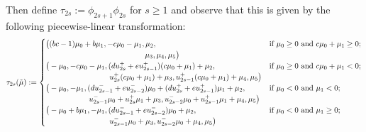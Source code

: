 \documentclass{amsart}
\numberwithin{theorem}{section}
\begin{document}
  Then define $\tau_{2s}:=\phi_{2s+1}\phi_{2s}$ for $s\ge 1$ and observe that this is given by the following piecewise-linear transformation:
  \begin{equation}
    \tau_{2s}(\tilde\mu)
    :=
    \begin{cases} 
      \big((bc-1)\mu_0+b\mu_1,-c\mu_0-\mu_1,\mu_2, & \text{if $\mu_0 \ge 0$ and $c\mu_0+\mu_1 \ge 0$;}\\
      \hspace{1.79in} \mu_3,\mu_4,\mu_5\big) & \\
      \big(-\mu_0,-c\mu_0-\mu_1,(du_{2s}^++eu_{2s-1}^+)(c\mu_0+\mu_1)+\mu_2, & \text{if $\mu_0 \ge 0$ and $c\mu_0+\mu_1 < 0$;}\\
      \hspace{1.15in} u_{2s}^+(c\mu_0+\mu_1)+\mu_3,u_{2s-1}^+(c\mu_0+\mu_1)+\mu_4,\mu_5\big) & \\ 
      \big(-\mu_0,-\mu_1,(du_{2s-1}^-+eu_{2s-2}^-)\mu_0+(du_{2s}^++eu_{2s-1}^+)\mu_1+\mu_2, & \text{if $\mu_0 < 0$ and $\mu_1 < 0$;}\\
      \hspace{0.78in} u_{2s-1}^-\mu_0+u_{2s}^+\mu_1+\mu_3,u_{2s-2}^-\mu_0+u_{2s-1}^+\mu_1+\mu_4,\mu_5\big) & \\ 
      \big(-\mu_0+b\mu_1,-\mu_1,(du_{2s-1}^-+eu_{2s-2}^-)\mu_0+\mu_2, & \text{if $\mu_0 < 0$ and $\mu_1 \ge 0$;}\\
      \hspace{1.15in} u_{2s-1}^-\mu_0+\mu_3,u_{2s-2}^-\mu_0+\mu_4,\mu_5\big) & 
    \end{cases}
  \end{equation}
\end{document}
